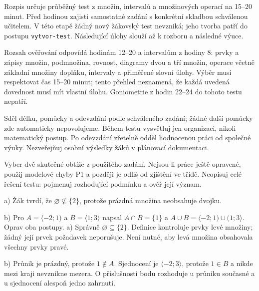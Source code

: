 \documentclass[11pt,a4paper]{article}
\begin{document}
Rozpis určuje průběžný test z množin, intervalů a množinových operací na 15–20 minut.
Před hodinou zajisti samostatné zadání s konkrétní skladbou schválenou učitelem.
V této etapě žádný nový žákovský test nevzniká; jeho tvorba patří do postupu
\texttt{vytvor-test}. Následující úlohy slouží až k rozboru a následné výuce.

Rozsah ověřování odpovídá hodinám 12–20 a intervalům z hodiny 8:
prvky a zápisy množin, podmnožina, rovnost, diagramy dvou a tří množin,
operace včetně základní množiny doplňku, intervaly a přiměřené slovní úlohy.
Výběr musí respektovat čas 15–20 minut; tento přehled neznamená,
že každá uvedená dovednost musí mít vlastní úlohu.
Goniometrie z hodin 22–24 do tohoto testu nepatří.


Sděl délku, pomůcky a odevzdání podle schváleného zadání;
žádné další pomůcky zde automaticky nepovolujeme.
Během testu vysvětluj jen organizaci, nikoli matematický postup.
Po odevzdání zřetelně odděl hodnocenou práci od společné výuky.
Nezveřejňuj osobní výsledky žáků v plánovací dokumentaci.

Vyber dvě skutečné obtíže z použitého zadání. Nejsou-li práce ještě opravené,
použij modelové chyby P1 a později je odliš od zjištění ve třídě.
Neopisuj celé řešení testu: pojmenuj rozhodující podmínku a ověř její význam.

\begin{prikladReseniBox}[title={P1: modelové chyby, nikoli zadání testu},breakable=false]
a) Žák tvrdí, že $\varnothing\nsubseteq\{2\}$, protože prázdná množina neobsahuje dvojku.

b) Pro $A=\langle-2;1)$ a $B=\langle1;3\rangle$ napsal
$A\cap B=\{1\}$ a $A\cup B=\langle-2;1)\cup(1;3\rangle$.
Oprav oba postupy.
\tcblower
a) Správně $\varnothing\subseteq\{2\}$. Definice kontroluje prvky
levé množiny; žádný její prvek požadavek neporušuje.
Není nutné, aby levá množina obsahovala všechny prvky pravé.

b) Průnik je prázdný, protože $1\notin A$.
Sjednocení je $\langle-2;3\rangle$, protože $1\in B$ a nikde mezi kraji nevznikne mezera.
O příslušnosti bodu rozhoduje u průniku současné a u sjednocení alespoň jedno zahrnutí.
\end{prikladReseniBox}
\end{document}
